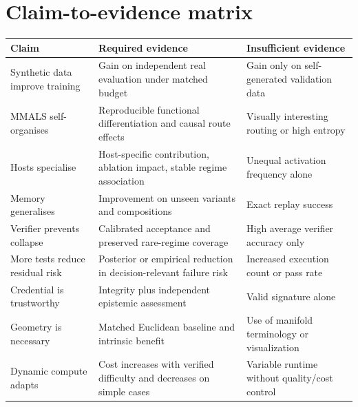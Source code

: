 \section{Claim-to-evidence matrix}

\begin{longtable}{p{}p{}p{}}
\toprule
\textbf{Claim} & \textbf{Required evidence} & \textbf{Insufficient evidence} \\
\midrule
Synthetic data improve training & Gain on independent real evaluation under matched budget & Gain only on self-generated validation data \\
MMALS self-organises & Reproducible functional differentiation and causal route effects & Visually interesting routing or high entropy \\
Hosts specialise & Host-specific contribution, ablation impact, stable regime association & Unequal activation frequency alone \\
Memory generalises & Improvement on unseen variants and compositions & Exact replay success \\
Verifier prevents collapse & Calibrated acceptance and preserved rare-regime coverage & High average verifier accuracy only \\
More tests reduce residual risk & Posterior or empirical reduction in decision-relevant failure risk & Increased execution count or pass rate \\
Credential is trustworthy & Integrity plus independent epistemic assessment & Valid signature alone \\
Geometry is necessary & Matched Euclidean baseline and intrinsic benefit & Use of manifold terminology or visualization \\
Dynamic compute adapts & Cost increases with verified difficulty and decreases on simple cases & Variable runtime without quality/cost control \\
\bottomrule
\end{longtable}

